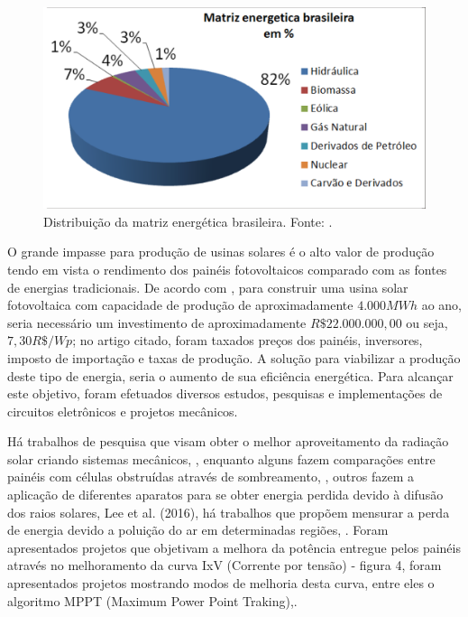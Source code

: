 \FloatBarrier
\begin{figure}[htbp]
	\centering
	\includegraphics[scale=0.5]{imagens/FontesEnergia}
	\caption{Distribuição da matriz energética brasileira. Fonte:  . }
	
	\label{fig:FonteEnergia}
\end{figure}
\FloatBarrier

O grande impasse para produção de usinas solares é o alto valor de produção tendo em vista o rendimento dos painéis fotovoltaicos comparado  com as fontes de energias tradicionais. De acordo com , para construir uma usina solar fotovoltaica com capacidade de produção de aproximadamente $4.000MWh$ ao ano, seria necessário um investimento de aproximadamente $R\$ 22.000.000,00$ ou seja, $7,30 R\$/Wp$; no artigo citado, foram taxados preços dos painéis, inversores, imposto de importação e taxas de produção. A solução para viabilizar a produção deste tipo de energia, seria o aumento de sua eficiência energética. Para alcançar este objetivo, foram efetuados diversos estudos, pesquisas e implementações de circuitos eletrônicos e projetos mecânicos.
 
Há trabalhos de pesquisa que visam obter o melhor aproveitamento da radiação solar criando sistemas mecânicos, ,  enquanto alguns fazem comparações entre painéis com células obstruídas através de sombreamento, , outros fazem a aplicação de diferentes aparatos para se obter energia perdida devido à difusão dos raios solares, Lee et al. (2016), há trabalhos que propõem mensurar a perda de energia devido a poluição do ar em determinadas regiões, . Foram apresentados projetos que objetivam a melhora da potência entregue pelos painéis através no melhoramento da curva IxV (Corrente por tensão) - figura 4, foram apresentados projetos mostrando modos de melhoria desta curva, entre eles o algoritmo MPPT (Maximum Power Point Traking),.  

